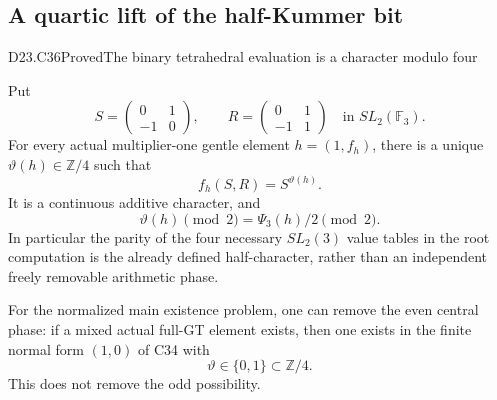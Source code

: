 \subsection{A quartic lift of the half-Kummer bit}

\begin{statement}{D23.C36}{Proved}{The binary tetrahedral evaluation is a character modulo four}
\end{statement}
Put
\[
 S=\begin{pmatrix}0&1\\-1&0\end{pmatrix},\qquad
 R=\begin{pmatrix}0&1\\-1&1\end{pmatrix}
                 \quad\text{in }SL_2(\mathbb F_3).
\]
For every actual multiplier-one gentle element $h=(1,f_h)$,
there is a unique $\vartheta(h)\in\mathbb Z/4$ such that
\[
                 f_h(S,R)=S^{\vartheta(h)}.
\tag{D23.C36.1}
\]
It is a continuous additive character, and
\[
             \vartheta(h)\pmod2=\Psi_3(h)/2\pmod2.
\tag{D23.C36.2}
\]
In particular the parity of the four necessary $SL_2(3)$
value tables in the root computation is the already defined
half-character, rather than an independent freely removable
arithmetic phase.

For the normalized main existence problem, one can remove
the even central phase: if a mixed actual full-GT element
exists, then one exists in the finite normal form $(1,0)$
of C34 with
\[
                       \vartheta\in\{0,1\}\subset\mathbb Z/4.
\tag{D23.C36.3}
\]
This does not remove the odd possibility.

